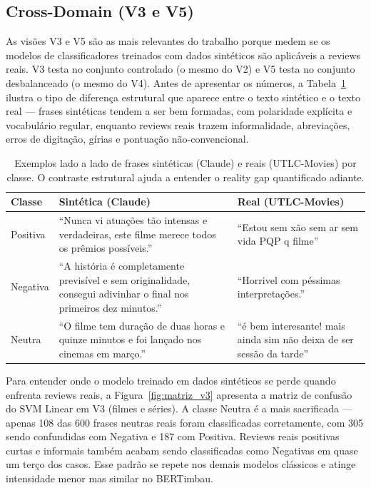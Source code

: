 \documentclass[12pt]{article}
\begin{document}
\subsection{Cross-Domain (V3 e V5)}

As visões V3 e V5 são as mais relevantes do trabalho porque medem se os modelos de classificadores treinados com dados sintéticos são aplicáveis a reviews reais. V3 testa no conjunto controlado (o mesmo do V2) e V5 testa no conjunto desbalanceado (o mesmo do V4). Antes de apresentar os números, a Tabela~\ref{tab:exemplos} ilustra o tipo de diferença estrutural que aparece entre o texto sintético e o texto real — frases sintéticas tendem a ser bem formadas, com polaridade explícita e vocabulário regular, enquanto reviews reais trazem informalidade, abreviações, erros de digitação, gírias e pontuação não-convencional.

\begin{table}[H]
\centering
\footnotesize
\caption{Exemplos lado a lado de frases sintéticas (Claude) e reais (UTLC-Movies) por classe. O contraste estrutural ajuda a entender o reality gap quantificado adiante.}
\label{tab:exemplos}
\begin{tabular}{p{1.3cm}p{5.5cm}p{5.5cm}}
\toprule
\textbf{Classe} & \textbf{Sintética (Claude)} & \textbf{Real (UTLC-Movies)} \\
\midrule
Positiva & ``Nunca vi atuações tão intensas e verdadeiras, este filme merece todos os prêmios possíveis.'' & ``Estou sem xão sem ar sem vida PQP q filme'' \\
\addlinespace
Negativa & ``A história é completamente previsível e sem originalidade, consegui adivinhar o final nos primeiros dez minutos.'' & ``Horrivel com péssimas interpretações.'' \\
\addlinespace
Neutra & ``O filme tem duração de duas horas e quinze minutos e foi lançado nos cinemas em março.'' & ``é bem interesante! mais ainda sim não deixa de ser sessão da tarde'' \\
\bottomrule
\end{tabular}
\end{table}

Para entender onde o modelo treinado em dados sintéticos se perde quando enfrenta reviews reais, a Figura~\ref{fig:matriz_v3} apresenta a matriz de confusão do SVM Linear em V3 (filmes e séries). A classe Neutra é a mais sacrificada — apenas 108 das 600 frases neutras reais foram classificadas corretamente, com 305 sendo confundidas com Negativa e 187 com Positiva. Reviews reais positivas curtas e informais também acabam sendo classificadas como Negativas em quase um terço dos casos. Esse padrão se repete nos demais modelos clássicos e atinge intensidade menor mas similar no BERTimbau.
\end{document}
